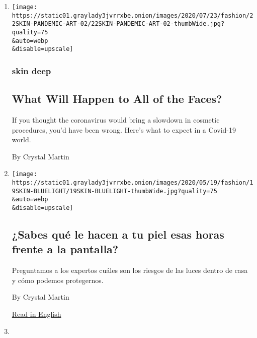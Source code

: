 \begin{enumerate}
\def\labelenumi{\arabic{enumi}.}
\item
  \href{/2020/07/23/style/skin-care-plastic-surgery-what-will-happen-to-all-of-the-faces.html}{}

  \texttt{[image: https://static01.graylady3jvrrxbe.onion/images/2020/07/23/fashion/22SKIN-PANDEMIC-ART-02/22SKIN-PANDEMIC-ART-02-thumbWide.jpg?quality=75\\\&auto=webp\\\&disable=upscale]}

  \hypertarget{skin-deep}{%
  \subsubsection{skin deep}\label{skin-deep}}

  \hypertarget{what-will-happen-to-all-of-the-faces}{%
  \subsection{What Will Happen to All of the
  Faces?}\label{what-will-happen-to-all-of-the-faces}}

  If you thought the coronavirus would bring a slowdown in cosmetic
  procedures, you'd have been wrong. Here's what to expect in a Covid-19
  world.

  By Crystal Martin
\item
  \href{/es/2020/05/26/espanol/estilos-de-vida/efectos-luz-pantalla-piel.html}{}

  \texttt{[image: https://static01.graylady3jvrrxbe.onion/images/2020/05/19/fashion/19SKIN-BLUELIGHT/19SKIN-BLUELIGHT-thumbWide.jpg?quality=75\\\&auto=webp\\\&disable=upscale]}

  \hypertarget{sabes-quuxe9-le-hacen-a-tu-piel-esas-horas-frente-a-la-pantalla}{%
  \subsection{¿Sabes qué le hacen a tu piel esas horas frente a la
  pantalla?}\label{sabes-quuxe9-le-hacen-a-tu-piel-esas-horas-frente-a-la-pantalla}}

  Preguntamos a los expertos cuáles son los riesgos de las luces dentro
  de casa y cómo podemos protegernos.

  By Crystal Martin

  \href{https://www.nytimes3xbfgragh.onion/2020/05/20/style/skin-damage-blue-light-what-is-all-of-that-screen-time-doing-to-your-skin.html}{Read
  in English}
\item
  \href{/2020/05/26/style/makeup-and-the-mask-its-about-the-eyes.html}{}


\end{enumerate}
